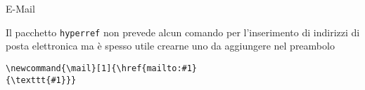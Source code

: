 \begin{frame}[fragile]{E-Mail}

Il pacchetto \texttt{hyperref} non prevede alcun comando per l'inserimento di
indirizzi di posta elettronica ma è spesso utile crearne uno da aggiungere nel
preambolo

\vfill

\begin{lstlisting}
\newcommand{\mail}[1]{\href{mailto:#1}
{\texttt{#1}}}
\end{lstlisting}

\end{frame}